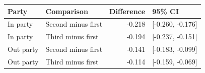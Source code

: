 
\begin{tabular}{llrl}
\toprule
Party & Comparison & Difference & 95\% CI\\
\midrule
In party & Second minus first & -0.218 & {}[-0.260, -0.176]\\
In party & Third minus first & -0.194 & {}[-0.237, -0.151]\\
Out party & Second minus first & -0.141 & {}[-0.183, -0.099]\\
Out party & Third minus first & -0.114 & {}[-0.159, -0.069]\\
\bottomrule
\end{tabular}
